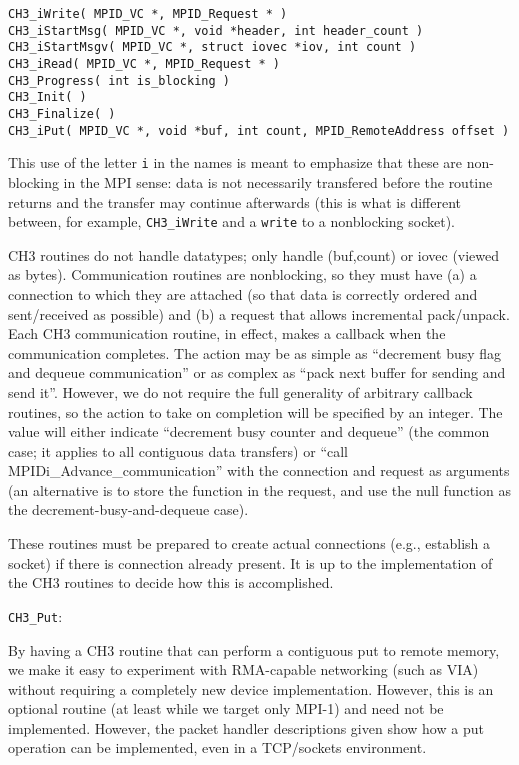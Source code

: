 \documentclass{article}
\def\code#1{\texttt{#1}}
\begin{document}
\begin{verbatim}
CH3_iWrite( MPID_VC *, MPID_Request * )
CH3_iStartMsg( MPID_VC *, void *header, int header_count )
CH3_iStartMsgv( MPID_VC *, struct iovec *iov, int count )
CH3_iRead( MPID_VC *, MPID_Request * )
CH3_Progress( int is_blocking )
CH3_Init( )
CH3_Finalize( )
CH3_iPut( MPID_VC *, void *buf, int count, MPID_RemoteAddress offset )
\end{verbatim}

This use of the letter \code{i} in the names is meant to emphasize that these
are non-blocking in the MPI sense: data is not necessarily transfered before
the routine returns and the transfer may continue afterwards (this is what is
different between, for example, \code{CH3_iWrite} and a \code{write} to a
nonblocking socket).

CH3 routines do not handle datatypes; only handle (buf,count) or iovec (viewed
as bytes).  Communication routines are nonblocking, so they must have (a) a
connection to which they are attached (so that data is correctly ordered and
sent/received as possible) and (b) a request that allows incremental
pack/unpack.  Each CH3 communication routine, in effect, makes a callback when
the communication completes.  The action may be as simple as ``decrement busy
flag and dequeue communication'' or as complex as ``pack next buffer for
sending and send it''.  However, we do not require the full generality of
arbitrary callback routines, so the action to take on completion will be
specified by an integer.  The value will either indicate ``decrement busy
counter and dequeue'' (the common case; it applies to all contiguous data
transfers) or ``call MPIDi_Advance_communication'' with the connection and
request as arguments (an alternative is to store the function in the request,
and use the null function as the decrement-busy-and-dequeue case).

These routines must be prepared to create actual connections (e.g., establish
a socket) if there is connection already present.  It is up to the
implementation of the CH3 routines to decide how this is accomplished.

\code{CH3_Put}:

By having a CH3 routine that can perform a contiguous put to remote memory, we
make it easy to experiment with RMA-capable networking (such as VIA) without
requiring a completely new device implementation.  However, this is an
optional routine (at least while we target only MPI-1) and need not be
implemented.  However, the packet handler descriptions given show how a put
operation can be implemented, even in a TCP/sockets environment.
\end{document}
